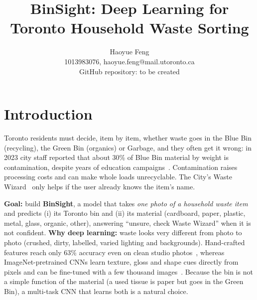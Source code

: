 \documentclass[final]{article}
\title{BinSight: Deep Learning for Toronto Household Waste Sorting}
\author{%
  Haoyue Feng \\
  1013983076, haoyue.feng@mail.utoronto.ca\\
  GitHub repository: to be created\\
}
\begin{document}
\maketitle

\vspace{-0.5in}

\section*{Introduction}
Toronto residents must decide, item by item, whether waste goes in the Blue Bin (recycling), the Green Bin (organics) or Garbage, and they often get it wrong: in 2023 city staff reported that about 30\% of Blue Bin material by weight is contamination, despite years of education campaigns~\cite{toronto2023}. Contamination raises processing costs and can make whole loads unrecyclable. The City's Waste Wizard~\cite{wastewizard} only helps if the user already knows the item's name.

\textbf{Goal:} build \textbf{BinSight}, a model that takes \emph{one photo of a household waste item} and predicts (i) its Toronto bin and (ii) its material (cardboard, paper, plastic, metal, glass, organic, other), answering ``unsure, check Waste Wizard'' when it is not confident. \textbf{Why deep learning:} waste looks very different from photo to photo (crushed, dirty, labelled, varied lighting and backgrounds). Hand-crafted features reach only 63\% accuracy even on clean studio photos~\cite{thung2016}, whereas ImageNet-pretrained CNNs learn texture, gloss and shape cues directly from pixels and can be fine-tuned with a few thousand images~\cite{bircanoglu2018}. Because the bin is not a simple function of the material (a used tissue is paper but goes in the Green Bin), a multi-task CNN that learns both is a natural choice.
\end{document}
